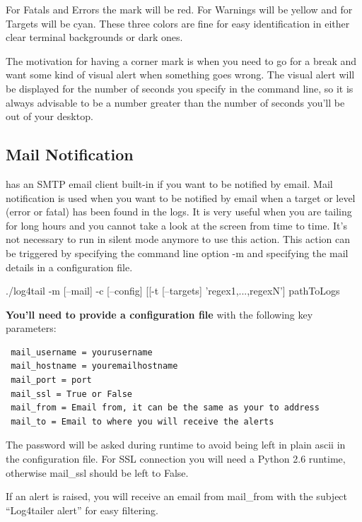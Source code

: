 For Fatals and Errors the mark will be red. For Warnings will be yellow and for Targets 
will be cyan. These three colors are fine for easy identification in either clear terminal
backgrounds or dark ones.

The motivation for having a corner mark is when you need to go for a break and
want some kind of visual alert when something goes wrong. The visual alert will
be displayed for the number of seconds you specify in the command line, so it
is always advisable to be a number greater than the number of seconds you'll be
out of your desktop. 

\subsection{Mail Notification}
\label{sec:mailnotification}
\logftailer{} has an SMTP email client built-in if you want to be notified by email.
Mail notification is used when you want to be notified by email when a target or level (error or fatal) has been found 
in the logs. It is very useful when you are tailing for long hours and you cannot take 
a look at the screen from time to time. It's not necessary to run in silent mode anymore 
to use this action.
This action can be triggered by specifying the command line option -m and
specifying the mail details in a configuration file. 

\begin{cmd}
 ./log4tail -m [--mail] -c [--config] [[-t [--targets] 'regex1,...,regexN'] pathToLogs
\end{cmd}

\textbf{You'll need to provide a configuration file} with the following key parameters:

\begin{config}
\begin{verbatim}
 mail_username = yourusername
 mail_hostname = youremailhostname 
 mail_port = port
 mail_ssl = True or False
 mail_from = Email from, it can be the same as your to address 
 mail_to = Email to where you will receive the alerts
\end{verbatim}
\end{config}

\noindent
The password will be asked during runtime to avoid being left in plain ascii in
the configuration file. For SSL connection you will need a Python 2.6 runtime,
otherwise mail\_ssl should be left to False.

If an alert is raised, you will receive an email from mail\_from with the
subject ``Log4tailer alert'' for easy filtering.

